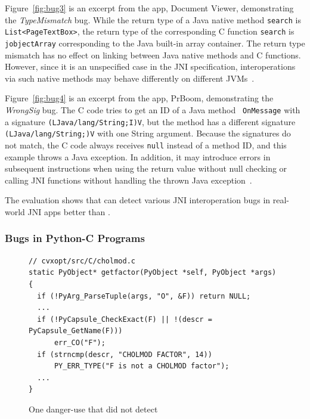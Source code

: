 Figure~\ref{fig:bug3} is an excerpt from the app, Document Viewer,
demonstrating the {\it TypeMismatch} bug.  While the return type of a Java
native method {\tt search} is {\tt List<PageTextBox>}, the return type of the
corresponding C function {\tt search} is {\tt jobjectArray} corresponding to
the Java built-in array container. The return type mismatch has no effect on
linking between Java native methods and C functions. However, since it is an
unspecified case in the JNI specification, interoperations via such native
methods may behave differently on different JVMs~\cite{LeeASE20}.


Figure~\ref{fig:bug4} is an excerpt from the app, PrBoom, demonstrating the
{\it WrongSig} bug.  The C code tries to get an ID of a Java method {\tt
OnMessage} with a signature \texttt{(LJava/lang/String;I)V}, but the method has
a different signature \texttt{(LJava/lang/String;)V} with one String argument.
Because the signatures do not match, the C code always receives {\tt null}
instead of a method ID, and this example throws a Java exception. In addition,
it may introduce errors in subsequent instructions when using the return value
without null checking or calling JNI functions without handling the thrown Java
exception~\cite{jniexcept}.

The evaluation shows that \ours can detect various JNI interoperation bugs in
real-world JNI apps better than \lees.

\subsubsection{Bugs in Python-C Programs}


\begin{figure}[ht!]
  \centering
  \vspace{2mm}
  \begin{lstlisting}[style=cpp,xleftmargin=2.5em]
// cvxopt/src/C/cholmod.c
static PyObject* getfactor(PyObject *self, PyObject *args)
{
  if (!PyArg_ParseTuple(args, "O", &F)) return NULL;
  ...
  if (!PyCapsule_CheckExact(F) || !(descr = PyCapsule_GetName(F)))
      err_CO("F");
  if (strncmp(descr, "CHOLMOD FACTOR", 14))
      PY_ERR_TYPE("F is not a CHOLMOD factor");
  ...
}
  \end{lstlisting}
    \vspace*{-.5em}
  \caption{One danger-use that \ours did not detect}
  \label{fig:cvxopt}
\end{figure}


